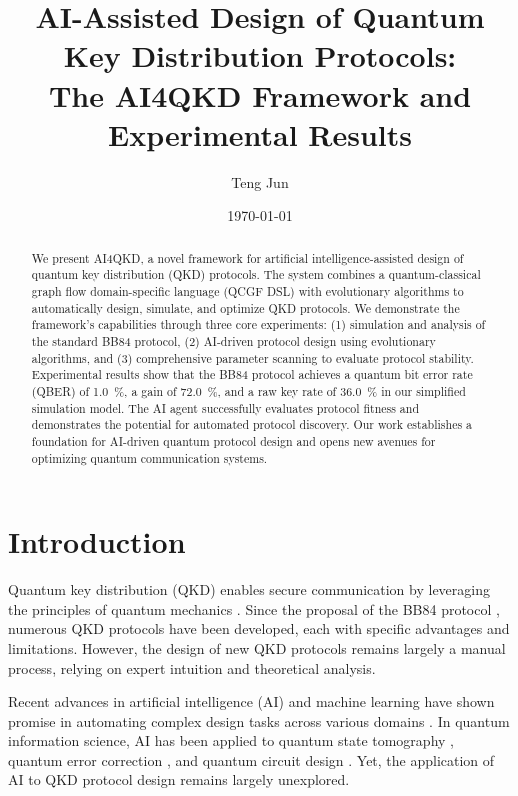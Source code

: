 \documentclass[aps,prl,reprint,superscriptaddress]{revtex4-2}
\begin{document}
\title{AI-Assisted Design of Quantum Key Distribution Protocols: \\ The AI4QKD Framework and Experimental Results}

\author{Teng Jun}

\date{\today}

\begin{abstract}
We present AI4QKD, a novel framework for artificial intelligence-assisted design of quantum key distribution (QKD) protocols. The system combines a quantum-classical graph flow domain-specific language (QCGF DSL) with evolutionary algorithms to automatically design, simulate, and optimize QKD protocols. We demonstrate the framework's capabilities through three core experiments: (1) simulation and analysis of the standard BB84 protocol, (2) AI-driven protocol design using evolutionary algorithms, and (3) comprehensive parameter scanning to evaluate protocol stability. Experimental results show that the BB84 protocol achieves a quantum bit error rate (QBER) of \SI{1.0}{\percent}, a gain of \SI{72.0}{\percent}, and a raw key rate of \SI{36.0}{\percent} in our simplified simulation model. The AI agent successfully evaluates protocol fitness and demonstrates the potential for automated protocol discovery. Our work establishes a foundation for AI-driven quantum protocol design and opens new avenues for optimizing quantum communication systems.
\end{abstract}

\maketitle

\section{Introduction}
Quantum key distribution (QKD) enables secure communication by leveraging the principles of quantum mechanics \cite{Bennett1984,Ekert1991}. Since the proposal of the BB84 protocol \cite{Bennett1984}, numerous QKD protocols have been developed, each with specific advantages and limitations. However, the design of new QKD protocols remains largely a manual process, relying on expert intuition and theoretical analysis.

Recent advances in artificial intelligence (AI) and machine learning have shown promise in automating complex design tasks across various domains \cite{Silver2017, Jumper2021}. In quantum information science, AI has been applied to quantum state tomography \cite{Torlai2018}, quantum error correction \cite{Bairey2019}, and quantum circuit design \cite{Zhang2020}. Yet, the application of AI to QKD protocol design remains largely unexplored.
\end{document}
